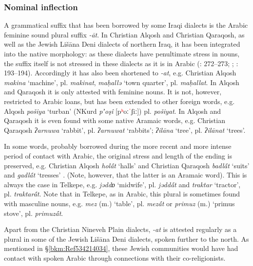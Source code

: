 \documentclass[output=paper]{langsci/langscibook}
\begin{document}
\subsubsection{\label{bkm:Ref534226861}Nominal inflection}

A grammatical suffix that has been borrowed by some Iraqi dialects is the Arabic feminine sound plural suffix \textit{{}-āt}. In Christian Alqosh and Christian Qaraqosh, as well as the Jewish Lišāna Deni dialects of northern Iraq, it has been integrated into the native morphology: as these dialects have penultimate stress in nouns, the suffix itself is not stressed in these dialects as it is in Arabic (\citealt{Coghill2004}: 272–273; \citeyear{Coghill2005}; \citealt{Khan2002}: 193–194). Accordingly it has also been shortened to \textit{\nobreakdash-at}, e.g. Christian Alqosh \textit{makina} ‘machine’, pl. \textit{makinat}, \textit{maḥallə} ‘town quarter’, pl. \textit{maḥallat}. In Alqosh and Qaraqosh it is only attested with feminine nouns. It is not, however, restricted to Arabic loans, but has been extended to other foreign words, e.g. Alqosh \textit{pošiya} ‘turban’ (NKurd \textit{pʼoşî} [p\textcolor{red}{ʰ}oː\textcolor{red}{ˈ}ʃiː]) pl. \textit{pošiyat}. In Alqosh and Qaraqosh it is even found with some native Aramaic words, e.g. Christian Qaraqosh \textit{ʔarnuwa} ‘rabbit’, pl. \textit{ʔarnuwat} ‘rabbits’; \textit{ʔilāna} ‘tree’, pl. \textit{ʔilānat} ‘trees’.

In some words, probably borrowed during the more recent and more intense period of contact with Arabic, the original stress and length of the ending is preserved, e.g. Christian Alqosh \textit{hol\'{ā}t} ‘halls’ and Christian Qaraqosh \textit{badl\'{ā}t} ‘suits’ and \textit{gadl\'{ā}t} ‘tresses’ \citep[194]{Khan2002}. (Note, however, that the latter is an Aramaic word). This is always the case in Telkepe, e.g. \textit{jəddɒ} ‘midwife’, pl. \textit{jədd\'{ā}t} and \textit{traktar} ‘tractor’, pl. \textit{traktar\'{ā}t}. Note that in Telkepe, as in Arabic, this plural is sometimes found with masculine nouns, e.g. \textit{mez} (m.) ‘table’, pl. \textit{mez\'{ā}t} or \textit{primuz} (m.) ‘primus stove’, pl. \textit{primuz\'{ā}t}.

Apart from the Christian Nineveh Plain dialects, \textit{\nobreakdash-at} is attested regularly as a plural in some of the Jewish Lišāna Deni dialects, spoken further to the north. As mentioned in §\ref{bkm:Ref534214034}, these Jewish communities would have had contact with spoken Arabic through connections with their co-religionists.
\end{document}
